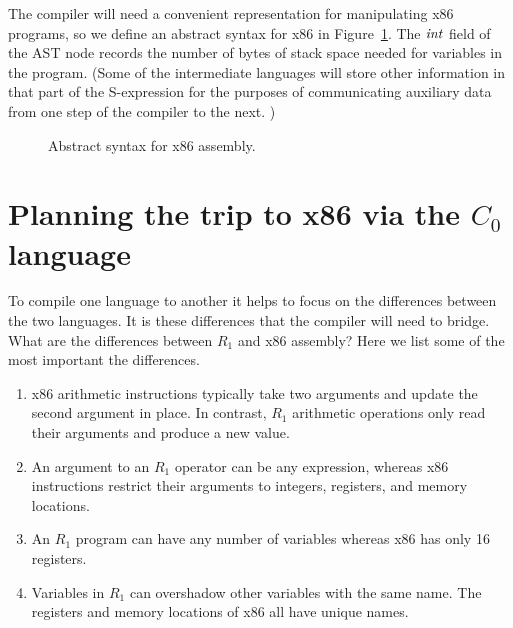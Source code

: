 \documentclass[11pt]{book}
\begin{document}
The compiler will need a convenient representation for manipulating
x86 programs, so we define an abstract syntax for x86 in
Figure~\ref{fig:x86-ast-a}. The $\mathit{int}$ field of the  AST
node records the number of bytes of stack space needed for variables
in the program. (Some of the intermediate languages will store other
information in that part of the S-expression for the purposes of
communicating auxiliary data from one step of the compiler to the
next. )

\begin{figure}[tp]
\caption{Abstract syntax for x86 assembly.}
\label{fig:x86-ast-a}
\end{figure}

\section{Planning the trip to x86 via the $C_0$ language}
\label{sec:plan-s0-x86}

To compile one language to another it helps to focus on the
differences between the two languages. It is these differences that
the compiler will need to bridge. What are the differences between
$R_1$ and x86 assembly? Here we list some of the most important the
differences.

\begin{enumerate}
\item x86 arithmetic instructions typically take two arguments and
  update the second argument in place. In contrast, $R_1$ arithmetic
  operations only read their arguments and produce a new value.

\item An argument to an $R_1$ operator can be any expression, whereas
  x86 instructions restrict their arguments to integers, registers,
  and memory locations.

\item An $R_1$ program can have any number of variables whereas x86
  has only 16 registers.

\item Variables in $R_1$ can overshadow other variables with the same
  name. The registers and memory locations of x86 all have unique
  names.
\end{enumerate}
\end{document}
